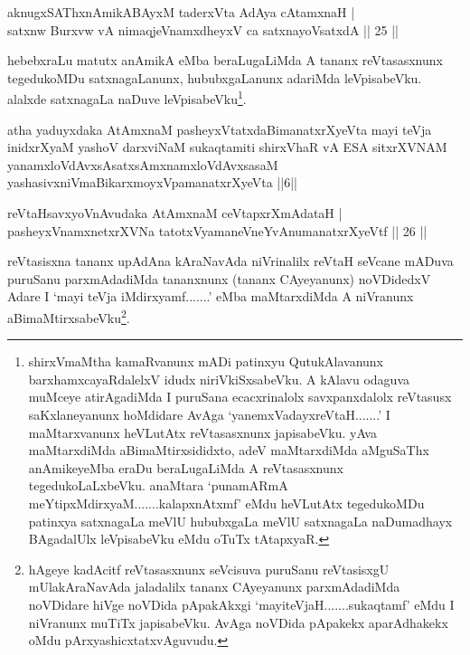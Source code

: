 
\begin{shl}
aknugxSAThxnAmikABAyxM taderxVta AdAya cA\s \s tamxnaH | \\
satxnw Burxvw vA nimaqjeVnamxdheyxV ca satxnayoVsatxdA \hfill|| 25 || 
\end{shl}

\begin{artha}
hebebxraLu matutx anAmikA eMba beraLugaLiMda A tananx reVtasasxnunx 
tegedukoMDu satxnagaLanunx, hububxgaLanunx adariMda leVpisabeVku. 
alalxde satxnagaLa naDuve leVpisabeVku\footnote[1]{shirxVmaMtha 
kamaRvanunx mADi patinxyu QutukAlavanunx barxhamxcayaRdalelxV idudx 
niriVkiSxsa\-beVku. A kAlavu odaguva muMceye atirAgadiMda I puruSana 
ecacxrinalolx savxpanxdalolx reVtasusx saKxlaneyanunx hoMdidare AvAga 
`yanemxVadayxreVtaH.......' I maMtarxvanunx heVLutAtx reVtasasxnunx 
japisabeVku. yAva maMtarxdiMda aBimaMtirxsididxto, adeV maMtarxdiMda 
aMguSaThx anAmikeyeMba eraDu beraLugaLiMda A reVtasasxnunx 
tegedukoLaLxbeVku. anaMtara `punamARmA meYtipxMdirxyaM.......kalapxnAtxmf' eMdu heVLutAtx tegedukoMDu 
patinxya satxnagaLa meVlU hububxgaLa meVlU satxnagaLa naDumadhayx 
BAgadalUlx leVpisabeVku eMdu oTuTx tAtapxyaR.}.
\end{artha}


\begin{shl}
atha yaduyxdaka AtAmxnaM pasheyxVtatxdaBimanatxrXyeVta mayi teVja inidxrXyaM yashoV darxviNaM sukaqtamiti shirxVhaR vA ESA sitxrXVNAM yanamxloVdAvxsAsatxsAmxnamxloVdAvxsasaM yashasivxniVmaBikarxmoyxVpamanatxrXyeVta ||6||
\end{shl}

\begin{shl}
reVtaHsavxyoVnAvudaka AtAmxnaM ceVtapxrXmAdataH | \\
pasheyxVnamxnetxrXVNa tatotxVyamaneVneYvAnumanatxrXyeVtf \hfill|| 26 || 
\end{shl}

\begin{artha}
reVtasisxna tananx upAdAna kAraNavAda niVrinalilx reVtaH seVcane 
mADuva puruSanu parxmAdadiMda tananxnunx (tananx CAyeyanunx) noVDidedxV 
Adare I `mayi teVja iMdirxyamf.......' eMba maMtarxdiMda A niVranunx 
aBimaMtirxsabeVku\footnote[2]{hAgeye kadAcitf reVtasasxnunx seVcisuva 
puruSanu reVtasisxgU mUlakAraNavAda jaladalilx tananx CAyeyanunx 
parxmAdadiMda noVDidare hiVge noVDida pApakAkxgi `mayiteVjaH.......sukaqtamf' eMdu I 
niVranunx muTiTx japisabeVku. AvAga noVDida pApakekx aparAdhakekx oMdu 
pArxyashicxtatxvAguvudu.}.
\end{artha}


